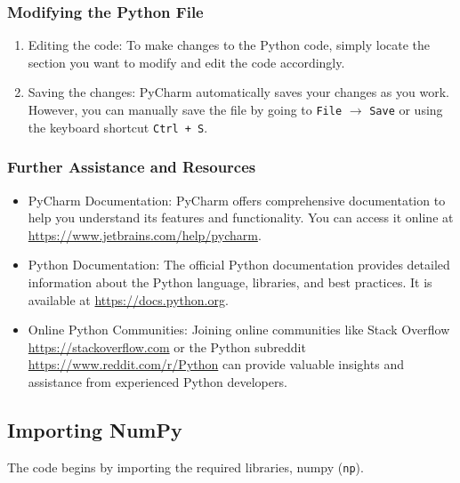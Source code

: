 \subsubsection{Modifying the Python File}

\begin{enumerate}
	
	\item Editing the code: To make changes to the Python code, simply locate the section you want to modify and edit the code accordingly.
	
	\item Saving the changes: PyCharm automatically saves your changes as you work. However, you can manually save the file by going to \texttt{File} $\rightarrow$ \texttt{Save} or using the keyboard shortcut \texttt{Ctrl + S}.
	
\end{enumerate}

\subsubsection{Further Assistance and Resources}

\begin{itemize}
	
	\item PyCharm Documentation: PyCharm offers comprehensive documentation to help you understand its features and functionality. You can access it online at \url{https://www.jetbrains.com/help/pycharm}.
	
	\item Python Documentation: The official Python documentation provides detailed information about the Python language, libraries, and best practices. It is available at \url{https://docs.python.org}.
	
	\item Online Python Communities: Joining online communities like Stack Overflow \url{https://stackoverflow.com} or the Python subreddit \url{https://www.reddit.com/r/Python} can provide valuable insights and assistance from experienced Python developers.
	
\end{itemize}

\subsection{Importing NumPy}
The code begins by importing the required libraries, numpy (\texttt{np}).

